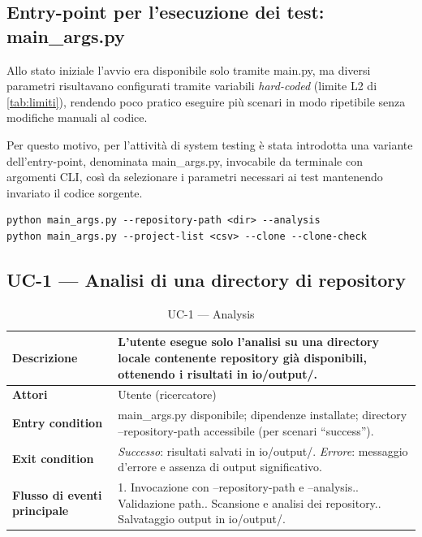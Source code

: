 \documentclass[11pt,a4paper]{article}
\makeatletter
\newif\ifmark@prevlower
\def\mark@casebreak#1{%
  \ifcat\noexpand#1\relax
    \mark@prevlowerfalse
  \else
    \ifnum`#1=\uccode`#1\relax
      \ifmark@prevlower\allowbreak\fi
      \mark@prevlowerfalse
    \else
      \ifnum`#1=\lccode`#1\relax
        \mark@prevlowertrue
      \else
        \mark@prevlowerfalse
      \fi
    \fi
  \fi}
\def\mark@brk#1{%
  \ifx#1\mark@stop
    \let\mark@next\relax
  \else
    \mark@casebreak{#1}%
    #1%
    \ifx#1.\allowbreak\else
      \ifx#1\_\allowbreak\else
        \ifx#1/\allowbreak\else
          \ifx#1(\allowbreak\fi
        \fi
      \fi
    \fi
    \let\mark@next\mark@brk
  \fi
  \mark@next}
\def\mark@stop{\mark@stop}
\DeclareRobustCommand{\mark@code}[1]{%
  \ifmmode
    \text{\ttfamily\small\mark@prevlowerfalse\mark@brk#1\mark@stop}%
  \else
    {\ttfamily\small\mark@prevlowerfalse\mark@brk#1\mark@stop}%
  \fi}
\DeclareRobustCommand{\pkgpath}[1]{\mark@code{#1}}
\DeclareRobustCommand{\file}[1]{\mark@code{#1}}
\DeclareRobustCommand{\flag}[1]{\mark@code{#1}}
\def\mark@code#1{#1}%
\def\pkgpath#1{#1}%
\def\file#1{#1}%
\def\flag#1{#1}%
\newcommand{\thead}[1]{\textbf{#1}}
\makeatother
\begin{document}
\subsection{Entry-point per l'esecuzione dei test: \file{main\_args.py}}
\label{sec:entrypoint}

Allo stato iniziale l'avvio era disponibile solo tramite \file{main.py}, ma
diversi parametri risultavano configurati tramite variabili \emph{hard-coded}
(limite L2 di \cref{tab:limiti}), rendendo poco pratico eseguire pi\`u scenari
in modo ripetibile senza modifiche manuali al codice.

Per questo motivo, per l'attivit\`a di system testing \`e stata introdotta una
variante dell'entry-point, denominata \file{main\_args.py}, invocabile da
terminale con argomenti CLI, cos\`i da selezionare i parametri necessari ai test
mantenendo invariato il codice sorgente.

\begin{lstlisting}[style=markshell,caption={Invocazione tipica usata dai test di sistema}]
python main_args.py --repository-path <dir> --analysis
python main_args.py --project-list <csv> --clone --clone-check
\end{lstlisting}

\subsection{UC-1 --- Analisi di una directory di repository}
\label{sec:uc1}

\begin{table}[H]
  \centering\small
  \caption{UC-1 --- Analysis}
  \label{tab:uc1}
  \begin{tabularx}{\linewidth}{@{}L{3.1cm} Y@{}}
    \toprule
    \thead{Descrizione} & L'utente esegue solo l'analisi su una directory locale
      contenente repository gi\`a disponibili, ottenendo i risultati in
      \pkgpath{io/output/}.\\
    \midrule
    \thead{Attori} & Utente (ricercatore)\\
    \midrule
    \thead{Entry condition} & \file{main\_args.py} disponibile; dipendenze
      installate; directory \flag{--repository-path} accessibile (per scenari
      ``success'').\\
    \midrule
    \thead{Exit condition} &
      \emph{Successo}: risultati salvati in \pkgpath{io/output/}.\newline
      \emph{Errore}: messaggio d'errore e assenza di output significativo.\\
    \midrule
    \thead{Flusso di eventi principale} &
      1. Invocazione con \flag{--repository-path} e \flag{--analysis}.. Validazione path.. Scansione e analisi dei repository.. Salvataggio output in \pkgpath{io/output/}.\\
    \bottomrule
  \end{tabularx}
\end{table}
\end{document}
